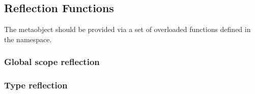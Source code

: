 \subsection{Reflection Functions}

The metaobject should be provided via a set of overloaded
functions defined in the \verb@std@ namespace.

\subsubsection{Global scope reflection}

\subsubsection{Type reflection}

